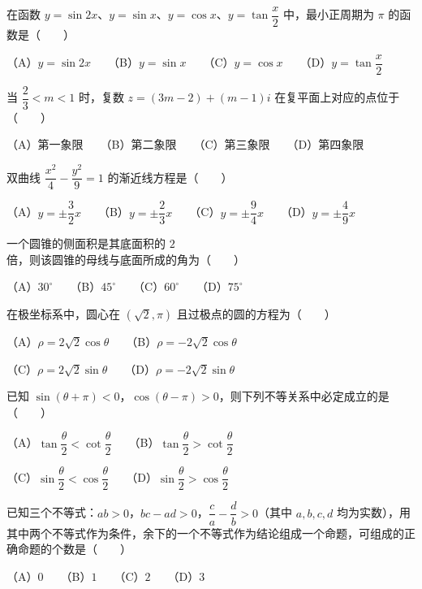 \begin{question}
在函数 $y=\sin 2x$、$y=\sin x$、$y=\cos x$、$y=\tan\dfrac{x}{2}$ 中，最小正周期为 $\pi$ 的函数是\mbox{（　　）}

（A）$y=\sin 2x$　　（B）$y=\sin x$　　（C）$y=\cos x$　　（D）$y=\tan\dfrac{x}{2}$

\end{question}
\begin{question}
当 $\dfrac{2}{3}<m<1$ 时，复数 $z=(3m-2)+(m-1)i$ 在复平面上对应的点位于\mbox{（　　）}

（A）第一象限　　（B）第二象限　　（C）第三象限　　（D）第四象限

\end{question}
\begin{question}
双曲线 $\dfrac{x^2}{4}-\dfrac{y^2}{9}=1$ 的渐近线方程是\mbox{（　　）}

（A）$y=\pm\dfrac{3}{2}x$　　（B）$y=\pm\dfrac{2}{3}x$　　（C）$y=\pm\dfrac{9}{4}x$　　（D）$y=\pm\dfrac{4}{9}x$

\end{question}
\begin{question}
一个圆锥的侧面积是其底面积的 $2$ 倍，则该圆锥的母线与底面所成的角为\mbox{（　　）}

（A）$30^\circ$　　（B）$45^\circ$　　（C）$60^\circ$　　（D）$75^\circ$

\end{question}
\begin{question}
在极坐标系中，圆心在 $(\sqrt2,\pi)$ 且过极点的圆的方程为\mbox{（　　）}

（A）$\rho=2\sqrt2\cos\theta$　　（B）$\rho=-2\sqrt2\cos\theta$

（C）$\rho=2\sqrt2\sin\theta$　　（D）$\rho=-2\sqrt2\sin\theta$

\end{question}
\begin{question}
已知 $\sin(\theta+\pi)<0$，$\cos(\theta-\pi)>0$，则下列不等关系中必定成立的是\mbox{（　　）}

（A）$\tan\dfrac\theta2<\cot\dfrac\theta2$　　（B）$\tan\dfrac\theta2>\cot\dfrac\theta2$

（C）$\sin\dfrac\theta2<\cos\dfrac\theta2$　　（D）$\sin\dfrac\theta2>\cos\dfrac\theta2$

\end{question}
\begin{question}
已知三个不等式：$ab>0$，$bc-ad>0$，$\dfrac{c}{a}-\dfrac{d}{b}>0$（其中 $a,b,c,d$ 均为实数），用其中两个不等式作为条件，余下的一个不等式作为结论组成一个命题，可组成的正确命题的个数是\mbox{（　　）}

（A）$0$　　（B）$1$　　（C）$2$　　（D）$3$

\end{question}

